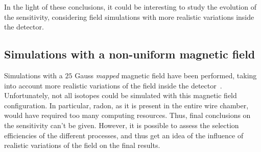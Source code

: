 In the light of these conclusions, it could be interesting to study the evolution of the sensitivity, considering field simulations with more realistic variations inside the detector.


\subsection{Simulations with a non-uniform magnetic field}
\label{subsec:mapped_field}

Simulations with a $25$ Gauss \emph{mapped} magnetic field have been performed, taking into account more realistic variations of the field inside the detector~\cite{docdb:map_magnetic_field2015}.
Unfortunately, not all isotopes could be simulated with this magnetic field configuration.
In particular, radon, as it is present in the entire wire chamber, would have required too many computing resources.
Thus, final conclusions on the sensitivity can't be given.
However, it is possible to assess the selection efficiencies of the different processes, and thus get an idea of the influence of realistic variations of the field on the final results.

